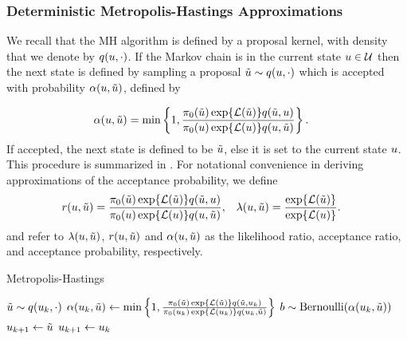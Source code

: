 \documentclass[12pt]{article}
\begin{document}
\subsubsection{Deterministic Metropolis-Hastings Approximations}
We recall that the MH algorithm is defined by a proposal kernel, with density that we denote by 
$\propDens(\Par, \cdot)$. If the Markov chain is in the current state $\Par \in \parSpace$ then 
the next state is defined by sampling a proposal $\propPar \sim \propDens(\Par, \cdot)$ which is 
accepted with probability $\accProbMH(\Par, \propPar)$, defined by 

\begin{align}
&\accProbMH(\Par, \propPar) = 
\min\left\{1, \frac{\priorDens(\propPar) \Exp{\llik(\propPar)} \propDens(\propPar, \Par)}{\priorDens(\Par) \Exp{\llik(\Par)} \propDens(\Par, \propPar)} \right\}.
\label{MH_acc_prob_exact}
\end{align}
If accepted, the next state is defined to be $\propPar$, else it is set to the current state $\Par$. 
This procedure is summarized in . For notational convenience in deriving approximations 
of the acceptance probability, we define 
\begin{align}
&\accProbRatio(\Par, \propPar) 
= \frac{\priorDens(\propPar) \Exp{\llik(\propPar)} \propDens(\propPar, \Par)}{\priorDens(\Par) \Exp{\llik(\Par)} \propDens(\Par, \propPar)}, 
&&\likRatio(\Par, \propPar) = \frac{\Exp{\llik(\propPar)}}{\Exp{\llik(\Par)}}.
\label{MH_acc_prob_exact}
\end{align}
and refer to $\likRatio(\Par, \propPar)$, $\accProbRatio(\Par, \propPar)$ and $\accProbMH(\Par, \propPar)$ 
as the likelihood ratio, acceptance ratio, and acceptance probability, respectively. 

\begin{algorithm}
    \caption{Metropolis-Hastings}
    \label{alg:MH}
    \begin{algorithmic}[1] %
        		\State $\propPar \sim \propDens(\indexMCMC{\Par}, \cdot)$ 
		\State $\accProbMH(\indexMCMC{\Par}, \propPar) \gets \min\left\{1, \frac{\priorDens(\propPar)\Exp{\llik(\propPar)}
				\propDens(\propPar, \indexMCMC{\Par})}{\priorDens(\indexMCMC{\Par}) \Exp{\llik(\indexMCMC{\Par})}  \propDens(\indexMCMC{\Par}, \propPar)} \right\}$
		\State $b \sim \text{Bernoulli}(\accProbMH(\indexMCMC{\Par}, \propPar))$
			\State $\indexMCMC[\mcmcIndex+1]{\Par} \gets \propPar$ 
		\Else
			\State $\indexMCMC[\mcmcIndex+1]{\Par} \gets \indexMCMC{\Par}$
		\EndIf
	\EndFor
	\EndFunction
    \end{algorithmic}
\end{algorithm}
\end{document}
